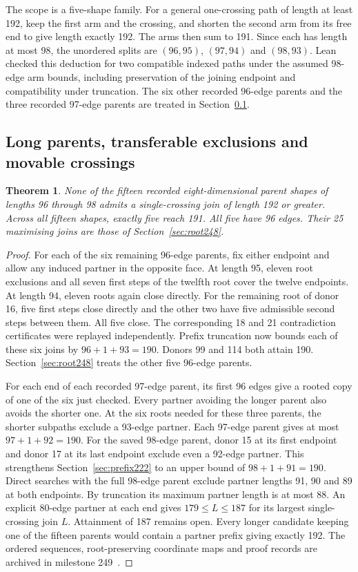 \documentclass[11pt,a4paper]{article}
\newtheorem{theorem}{Theorem}[section]
\theoremstyle{definition}
\theoremstyle{remark}
\begin{document}
The scope is a five-shape family. For a general one-crossing path of
length at least 192, keep the first arm and the crossing, and shorten
the second arm from its free end to give length exactly 192.
The arms then sum to 191. Since each has length at
most 98, the unordered splits are \((96,95)\), \((97,94)\) and
\((98,93)\). Lean checked this deduction for two compatible indexed
paths under the assumed 98-edge arm bounds, including preservation of
the joining endpoint and compatibility under truncation.
The six other recorded 96-edge parents and the three recorded 97-edge
parents are treated in Section~\ref{sec:long249}.

\subsection{Long parents, transferable exclusions and movable crossings}\label{sec:long249}

\begin{theorem}
None of the fifteen recorded eight-dimensional parent shapes of lengths
96 through 98 admits a single-crossing join of length 192 or greater.
Across all fifteen shapes, exactly five reach 191. All five have 96
edges. Their 25 maximising joins are those of Section~\ref{sec:root248}.
\end{theorem}
\begin{proof}
For each of the six remaining 96-edge parents, fix either endpoint and
allow any induced partner in the opposite face. At length 95, eleven
root exclusions and all seven first steps of the twelfth root cover the
twelve endpoints. At length 94, eleven roots again close directly.
For the remaining root of donor 16, five first steps close directly and
the other two have five admissible second steps between them. All five
close. The corresponding 18 and 21 contradiction certificates were
replayed independently. Prefix truncation now bounds each of these
six joins by \(96+1+93=190\). Donors 99 and 114 both attain 190.
Section~\ref{sec:root248} treats the other five 96-edge parents.

For each end of each recorded 97-edge parent, its first 96 edges
give a rooted copy of one of the six just checked. Every partner
avoiding the longer parent also avoids the shorter one. At the six
roots needed for these three parents, the shorter subpaths exclude
a 93-edge partner. Each 97-edge parent gives at most
\(97+1+92=190\). For the saved 98-edge parent, donor 15 at its
first endpoint and donor 17 at its last endpoint exclude even a
92-edge partner. This strengthens Section~\ref{sec:prefix222}
to an upper bound of \(98+1+91=190\).
Direct searches with the full 98-edge parent exclude partner
lengths 91, 90 and 89 at both endpoints. By truncation its maximum
partner length is at most 88. An explicit 80-edge partner at each
end gives \(179\le L\le187\) for its largest single-crossing join
\(L\). Attainment of 187 remains open.
Every longer candidate keeping one of the fifteen parents would
contain a partner prefix giving exactly 192. The ordered sequences,
root-preserving coordinate maps and proof records are archived in
milestone 249~\cite{long249}.
\end{proof}
\end{document}
